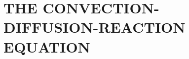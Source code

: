 \documentclass[../Dissertation]{subfiles}
\begin{document}

    \chapter{\uppercase{The Convection-Diffusion-Reaction Equation}}\label{chp:2}
    
    \vspace{-2ex}

    
    
    
    

    \printbibliography[segment=\therefsegment,heading=references]
\end{document}
